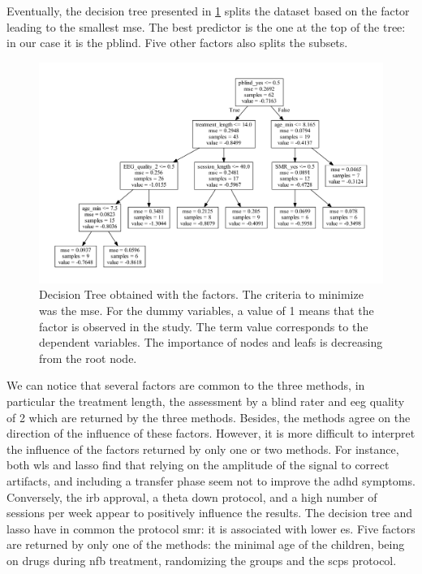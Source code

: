 Eventually, the decision tree presented in \cref{Figure:factors_analysis_decision_tree_results} splits the dataset based on the factor leading to the
smallest \gls{mse}. The best predictor is the one at the top of the tree: in our case it is the \gls{pblind}. Five other factors also splits the subsets. 

\begin{figure}[h!]
  \centering
  \includegraphics[width=1.0\linewidth]{figures/factors_analysis_decision_tree_results_no_colors_2-columns_fitting_image}
  \caption{Decision Tree obtained with the factors. The criteria to minimize was the \gls{mse}. For the dummy variables, a value of 1 means
	that the factor is observed in the study. The term value corresponds to the dependent variables. The importance of nodes and leafs is decreasing
	from the root node.}
  \label{Figure:factors_analysis_decision_tree_results}
\end{figure}

We can notice that several factors are common to the three methods, in particular the treatment length, the assessment 
by a blind rater and \gls{eeg} quality of 2 which are returned by the three methods. Besides, 
the methods agree on the direction of the influence of these factors. However, it is more difficult to interpret the influence of the factors 
returned by only one or two methods. For instance, both \gls{wls} and \gls{lasso} find that  
relying on the amplitude of the signal to correct artifacts, and including a transfer phase seem not to improve the \gls{adhd} symptoms. 
Conversely, the \gls{irb} approval, a theta down protocol, and a high number of sessions per week appear to 
positively influence the results. The decision tree and \gls{lasso} have in common the protocol \gls{smr}: it is associated with lower \gls{es}.
Five factors are returned by only one of the methods: the minimal age of the children, being on drugs 
during \gls{nfb} treatment, randomizing the groups and the \glspl{scp} protocol. 



